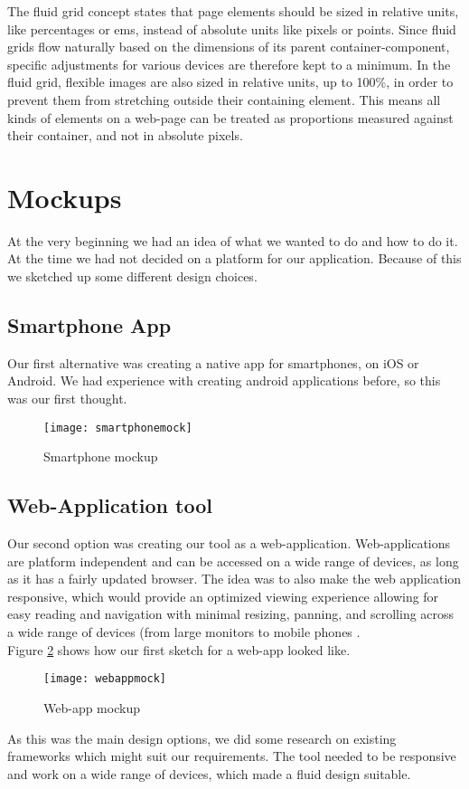 The fluid grid\citep{fluidgrid, fluidarticle} concept states that page elements should be sized in relative units, like percentages or ems, instead of absolute units like pixels or points. Since fluid grids flow naturally based on the dimensions of its parent container-component, specific adjustments for various devices are therefore kept to a minimum. In the fluid grid, flexible images are also sized in relative units, up to 100\%, in order to prevent them from stretching outside their containing element\citep{fluidimages}. This means all kinds of elements on a web-page can be treated as proportions measured against their container, and not in absolute pixels. 

\section{Mockups}
At the very beginning we had an idea of what we wanted to do and how to do it. At the time we had not decided on a platform for our application. Because of this we sketched up some different design choices.

\subsection{Smartphone App}
Our first alternative was creating a native app for smartphones, on iOS or Android. We had experience with creating android applications before, so this was our first thought. 
\begin{figure}[H]
\centering
	\texttt{[image: smartphonemock]}
\caption{Smartphone mockup}
\label{smartphonemock}
\end{figure}

\subsection{Web-Application tool}
Our second option was creating our tool as a web-application. Web-applications are platform independent and can be accessed on a wide range of devices, as long as it has a fairly updated browser. The idea was to also make the web application responsive, which would provide an optimized viewing experience allowing for easy reading and navigation with minimal resizing, panning, and scrolling across a wide range of devices (from large monitors to mobile phones .\\
Figure \ref{webappmock} shows how our first sketch for a web-app looked like.
\begin{figure}[H]
\centering 
	\texttt{[image: webappmock]}
\caption{Web-app mockup}
\label{webappmock}
\end{figure}
As this was the main design options, we did some research on existing frameworks which might suit our requirements. The tool needed to be responsive and work on a wide range of devices, which made a fluid design suitable.


